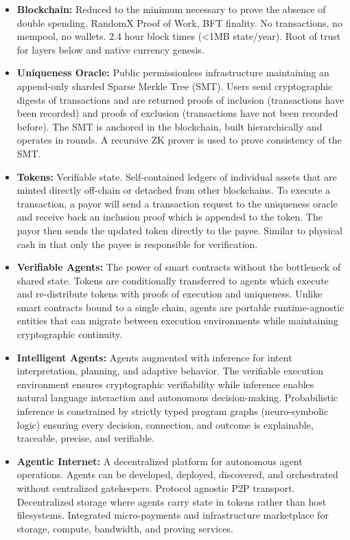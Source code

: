 \documentclass{article}
\begin{document}
\begin{itemize}
    \item \textbf{Blockchain:}
    Reduced to the  minimum necessary to prove the absence of double spending. RandomX Proof of Work, BFT finality. No transactions, no mempool, no wallets. 2.4 hour block times (<1MB state/year). Root of trust for layers below and native currency genesis.

    \item \textbf{Uniqueness Oracle:}
    Public permissionless infrastructure maintaining an append-only sharded Sparse Merkle Tree (SMT). Users send cryptographic digests of transactions and are returned proofs of inclusion (transactions have been recorded) and proofs of exclusion (transactions have not been recorded before). The SMT is anchored in the blockchain, built hierarchically and operates in rounds. A recursive ZK prover is used to prove consistency of the SMT.

    \item \textbf{Tokens:}
    Verifiable state. Self-contained ledgers of individual assets that are minted directly off-chain or detached from other blockchains. To execute a transaction, a payor will send a transaction request to the uniqueness oracle and receive back an inclusion proof which is appended to the token. The payor then sends the updated token directly to the payee. Similar to physical cash in that only the payee is responsible for verification.

    \item \textbf{Verifiable Agents:}
    The power of smart contracts without the bottleneck of shared state. Tokens are conditionally transferred to agents which execute and re-distribute tokens with proofs of execution and uniqueness. Unlike smart contracts bound to a single chain, agents are portable runtime-agnostic entities that can migrate between execution environments while maintaining cryptographic continuity.

    \item \textbf{Intelligent Agents:}
    Agents augmented with inference for intent interpretation, planning, and adaptive behavior. The verifiable execution environment ensures cryptographic verifiability while inference enables natural language interaction and autonomous decision-making. Probabilistic inference is constrained by strictly typed program graphs (neuro-symbolic logic) ensuring every decision, connection, and outcome is explainable, traceable, precise, and verifiable.

    \item \textbf{Agentic Internet:}
    A decentralized platform for autonomous agent operations. Agents can be developed, deployed, discovered, and orchestrated without centralized gatekeepers. Protocol agnostic P2P transport. Decentralized storage where agents carry state in tokens rather than host filesystems. Integrated micro-payments and infrastructure marketplace for storage, compute, bandwidth, and proving services.
\end{itemize}
\end{document}
